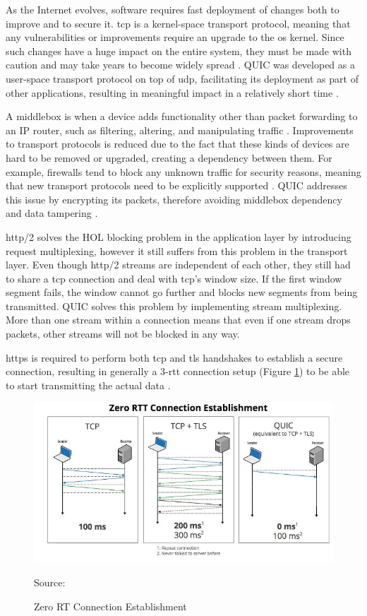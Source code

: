 As the Internet evolves, software requires fast deployment of changes both to improve and to secure it. \gls{tcp} is a kernel-space transport protocol, meaning that any vulnerabilities or improvements require an upgrade to the \gls{os} kernel. Since such changes have a huge impact on the entire system, they must be made with caution and may take years to become widely spread \cite{rfc9000}. QUIC was developed as a user-space transport protocol on top of \gls{udp}, facilitating its deployment as part of other applications, resulting in meaningful impact in a relatively short time \cite{quic_protocol}.

A middlebox is when a device adds functionality other than packet forwarding to an IP router, such as filtering, altering, and manipulating traffic \cite{rfc3234}. Improvements to transport protocols is reduced due to the fact that these kinds of devices are hard to be removed or upgraded, creating a dependency between them. For example, firewalls tend to block any unknown traffic for security reasons, meaning that new transport protocols need to be explicitly supported \cite{rfc3234}. QUIC addresses this issue by encrypting its packets, therefore avoiding middlebox dependency and data tampering \cite{quic_protocol}.

\gls{http}/2 solves the HOL blocking problem in the application layer by introducing request multiplexing, however it still suffers from this problem in the transport layer. Even though \gls{http}/2 streams are independent of each other, they still had to share a \gls{tcp} connection and deal with \gls{tcp}’s window size. If the first window segment fails, the window cannot go further and blocks new segments from being transmitted. QUIC solves this problem by implementing stream multiplexing. More than one stream within a connection means that even if one stream drops packets, other streams will not be blocked in any way.

\gls{https} is required to perform both \gls{tcp} and \gls{tls} handshakes to establish a secure connection, resulting in generally a 3-\gls{rtt} connection setup (Figure \ref{figure:tcp_v_tls_v_quic_handshake}) to be able to start transmitting the actual data \cite{rfc7413}.

\begin{figure}[ht]
    \centering
    \includegraphics[width=\linewidth]{figures/quic_zerortt.png}
    \caption{Zero RT Connection Establishment}
    {Source: \cite{google_edge_network}}
    \label{figure:tcp_v_tls_v_quic_handshake}
\end{figure}

